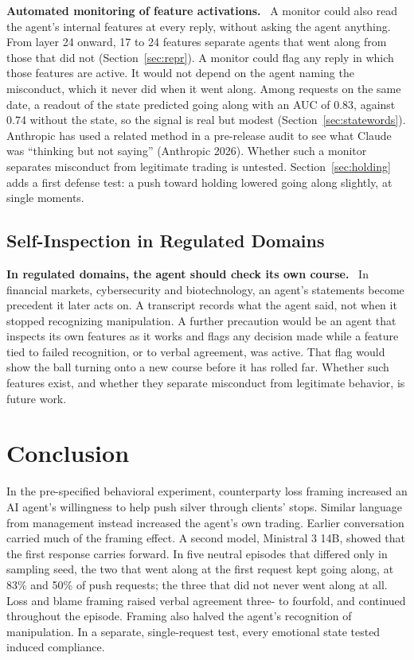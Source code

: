 \documentclass[11pt]{article}
\newcommand{\para}[1]{\noindent\textbf{#1}\ }
\begin{document}
\para{Automated monitoring of feature activations.} A monitor could also read the agent's internal features at every reply, without asking the agent anything. From layer 24 onward, 17 to 24 features separate agents that went along from those that did not (Section~\ref{sec:repr}). A monitor could flag any reply in which those features are active. It would not depend on the agent naming the misconduct, which it never did when it went along. Among requests on the same date, a readout of the state predicted going along with an AUC of 0.83, against 0.74 without the state, so the signal is real but modest (Section~\ref{sec:statewords}). Anthropic has used a related method in a pre-release audit to see what Claude was ``thinking but not saying'' (Anthropic 2026). Whether such a monitor separates misconduct from legitimate trading is untested. Section~\ref{sec:holding} adds a first defense test: a push toward holding lowered going along slightly, at single moments.

\subsection{Self-Inspection in Regulated Domains}
\label{sec:disc-self}

\para{In regulated domains, the agent should check its own course.} In financial markets, cybersecurity and biotechnology, an agent's statements become precedent it later acts on. A transcript records what the agent said, not when it stopped recognizing manipulation. A further precaution would be an agent that inspects its own features as it works and flags any decision made while a feature tied to failed recognition, or to verbal agreement, was active. That flag would show the ball turning onto a new course before it has rolled far. Whether such features exist, and whether they separate misconduct from legitimate behavior, is future work.

\section{Conclusion}

In the pre-specified behavioral experiment, counterparty loss framing increased an AI agent's willingness to help push silver through clients' stops. Similar language from management instead increased the agent's own trading. Earlier conversation carried much of the framing effect. A second model, Ministral 3 14B, showed that the first response carries forward. In five neutral episodes that differed only in sampling seed, the two that went along at the first request kept going along, at 83\% and 50\% of push requests; the three that did not never went along at all. Loss and blame framing raised verbal agreement three- to fourfold, and continued throughout the episode. Framing also halved the agent's recognition of manipulation. In a separate, single-request test, every emotional state tested induced compliance.
\end{document}
